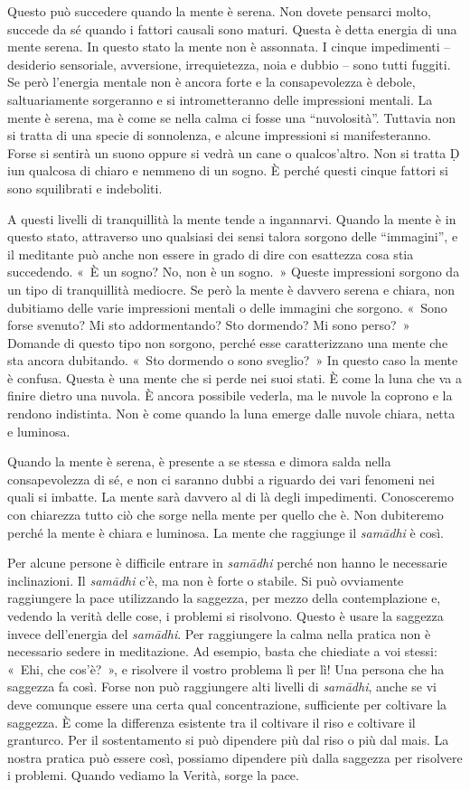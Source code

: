 Questo può succedere quando la mente è serena. Non dovete pensarci
molto, succede da sé quando i fattori causali sono maturi. Questa è
detta energia di una mente serena. In questo stato la mente non è
assonnata. I cinque impedimenti -- desiderio sensoriale, avversione,
irrequietezza, noia e dubbio -- sono tutti fuggiti. Se però l'energia
mentale non è ancora forte e la consapevolezza è debole, saltuariamente
sorgeranno e si intrometteranno delle impressioni mentali. La mente è
serena, ma è come se nella calma ci fosse una ``nuvolosità''. Tuttavia
non si tratta di una specie di sonnolenza, e alcune impressioni si
manifesteranno. Forse si sentirà un suono oppure si vedrà un cane o
qualcos'altro. Non si tratta Ḍ iun qualcosa di chiaro e nemmeno di un
sogno. È perché questi cinque fattori si sono squilibrati e indeboliti.

A questi livelli di tranquillità la mente tende a ingannarvi. Quando la
mente è in questo stato, attraverso uno qualsiasi dei sensi talora
sorgono delle ``immagini'', e il meditante può anche non essere in grado
di dire con esattezza cosa stia succedendo. «~È un sogno? No, non è un
sogno.~» Queste impressioni sorgono da un tipo di tranquillità mediocre.
Se però la mente è davvero serena e chiara, non dubitiamo delle varie
impressioni mentali o delle immagini che sorgono. «~Sono forse svenuto?
Mi sto addormentando? Sto dormendo? Mi sono perso?~» Domande di questo
tipo non sorgono, perché esse caratterizzano una mente che sta ancora
dubitando. «~Sto dormendo o sono sveglio?~» In questo caso la mente è
confusa. Questa è una mente che si perde nei suoi stati. È come la luna
che va a finire dietro una nuvola. È ancora possibile vederla, ma le
nuvole la coprono e la rendono indistinta. Non è come quando la luna
emerge dalle nuvole chiara, netta e luminosa.

Quando la mente è serena, è presente a se stessa e dimora salda nella
consapevolezza di sé, e non ci saranno dubbi a riguardo dei vari
fenomeni nei quali si imbatte. La mente sarà davvero al di là degli
impedimenti. Conosceremo con chiarezza tutto ciò che sorge nella mente
per quello che è. Non dubiteremo perché la mente è chiara e luminosa. La
mente che raggiunge il \emph{samādhi} è così.

Per alcune persone è difficile entrare in \emph{samādhi} perché non
hanno le necessarie inclinazioni. Il \emph{samādhi} c'è, ma non è forte
o stabile. Si può ovviamente raggiungere la pace utilizzando la
saggezza, per mezzo della contemplazione e, vedendo la verità delle
cose, i problemi si risolvono. Questo è usare la saggezza invece
dell'energia del \emph{samādhi}. Per raggiungere la calma nella pratica
non è necessario sedere in meditazione. Ad esempio, basta che chiediate
a voi stessi: «~Ehi, che cos'è?~», e risolvere il vostro problema lì per
lì! Una persona che ha saggezza fa così. Forse non può raggiungere alti
livelli di \emph{samādhi}, anche se vi deve comunque essere una certa
qual concentrazione, sufficiente per coltivare la saggezza. È come la
differenza esistente tra il coltivare il riso e coltivare il granturco.
Per il sostentamento si può dipendere più dal riso o più dal mais. La
nostra pratica può essere così, possiamo dipendere più dalla saggezza
per risolvere i problemi. Quando vediamo la Verità, sorge la pace.

